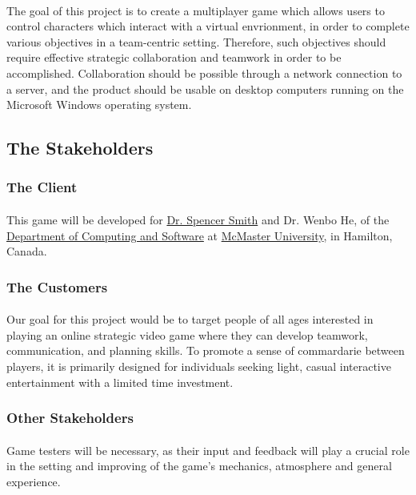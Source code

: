 \documentclass[12pt, titlepage]{article}
\begin{document}
\paragraph{}The goal of this project is to create a  multiplayer game which allows users to control characters which interact with a virtual envrionment, in order to complete various objectives in a team-centric setting. Therefore, such objectives should require effective strategic collaboration and teamwork in order to be accomplished.  Collaboration should be possible through a network connection to a server, and the product should be usable on desktop computers running on the Microsoft Windows operating system.
\subsection{The Stakeholders}
\subsubsection{The Client}
\paragraph{}This game will be developed for \href{http://www.cas.mcmaster.ca/~smiths/}{Dr. Spencer Smith} and Dr. Wenbo He, of the \href{http://www.cas.mcmaster.ca}{Department of Computing and Software} at \href{http://www.mcmaster.ca}{McMaster University}, in Hamilton, Canada.
\subsubsection{The Customers}
\paragraph{}Our goal for this project would be to target people of all ages interested in playing an online strategic video game where they can develop teamwork, communication, and planning skills. To promote a sense of commardarie between players, it is primarily designed for individuals seeking light, casual interactive entertainment with a limited time investment.
\subsubsection{Other Stakeholders}
\paragraph{} Game testers will be necessary, as their input and feedback will play a crucial role in the setting and improving of the game's mechanics, atmosphere and general experience.
\end{document}
